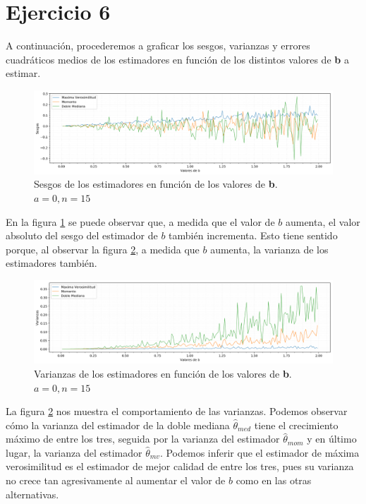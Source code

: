 \section{Ejercicio 6}
A continuación, procederemos a graficar los sesgos, varianzas y errores cuadráticos medios de los estimadores en función de los distintos valores de \textbf{b} a estimar.

\begin{figure}[H]
	\centering
	\includegraphics[width=1\textwidth]{imagenes/sesgos.png}
	\caption{\footnotesize Sesgos de los estimadores en función de los valores de \textbf{b}. $a=0, n=15$}
	\label{fig:ej6-sesgos}
\end{figure}

En la figura \ref{fig:ej6-sesgos} se puede observar que, a medida que el valor de $b$ aumenta, el valor absoluto del sesgo del estimador de $b$ también incrementa. Esto tiene sentido porque, al observar la figura \ref{fig:ej6-varianzas}, a medida que $b$ aumenta, la varianza de los estimadores también.

\begin{figure}[H]
	\centering
	\includegraphics[width=1\textwidth]{imagenes/varianzas.png}
	\caption{\footnotesize Varianzas de los estimadores en función de los valores de \textbf{b}. $a=0, n=15$}
	\label{fig:ej6-varianzas}
\end{figure}

La figura \ref{fig:ej6-varianzas} nos muestra el comportamiento de las varianzas. Podemos observar cómo la varianza del estimador de la doble mediana $\hat{\theta}_{med}$ tiene el crecimiento máximo de entre los tres, seguida por la varianza del estimador $\hat{\theta}_{mom}$ y en último lugar, la varianza del estimador $\hat{\theta}_{mv}$. Podemos inferir que el estimador de máxima verosimilitud es el estimador de mejor calidad de entre los tres, pues su varianza no crece tan agresivamente al aumentar el valor de $b$ como en las otras alternativas.

